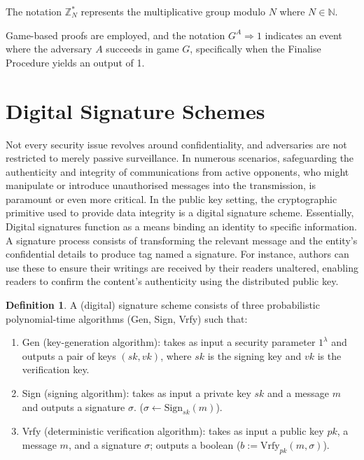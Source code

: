 \documentclass[]{final_report}
\theoremstyle{definition}
\newtheorem{definition}{Definition}[chapter]
\begin{document}
The notation \( \mathbb{Z}_N^* \) represents the multiplicative group modulo \( N \) where \( N \in \mathbb{N} \). 

Game-based proofs are employed, and the notation \( G^A \Rightarrow 1 \) indicates an event where the adversary \( A \) succeeds in game \( G \), specifically when the Finalise Procedure yields an output of 1.


\section{Digital Signature Schemes}
Not every security issue revolves around confidentiality, and adversaries are not restricted to merely passive surveillance. In numerous scenarios, safeguarding the authenticity and integrity of communications from active opponents, who might manipulate or introduce unauthorised messages into the transmission, is paramount or even more critical. In the public key setting, the cryptographic primitive used to provide data integrity is a digital signature scheme. Essentially, Digital signatures function as a means binding an identity to specific information. A signature process consists of transforming the relevant message and the entity's confidential details to produce tag named a signature. 
For instance, authors can use these to ensure their writings are received by their readers unaltered, enabling readers to confirm the content's authenticity using the distributed public key.


\begin{definition}
\label{def:digital signature}
A (digital) signature scheme consists of three probabilistic polynomial-time algorithms (Gen, Sign, Vrfy) such that:
\begin{enumerate}
    \item Gen (key-generation algorithm): takes as input a security parameter $1^\lambda$ and outputs a pair of keys $(sk ,vk)$, where $sk$ is the signing key and $vk$ is the verification key.
    \item Sign (signing algorithm): takes as input a private key $sk$ and a message $m$ and outputs a signature $\sigma$. ($\sigma \leftarrow \text{Sign}_{sk}(m)$).
    \item Vrfy (deterministic verification algorithm):  takes as input a public key $pk$, a message $m$, and a signature $\sigma$; outputs a boolean ($b := \text{Vrfy}_{pk}(m, \sigma)$).
\end{enumerate}
\end{definition}
\end{document}
